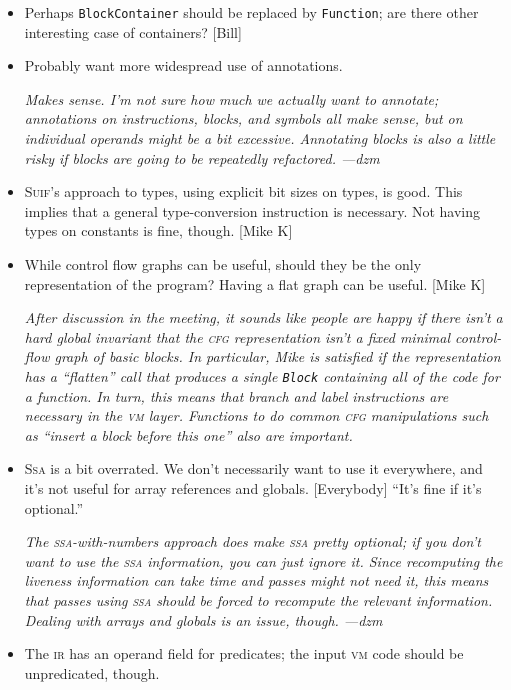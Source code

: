 \documentclass[11pt]{article}
\def\class#1{\texttt{#1}}
\def\cfg{\textsc{cfg}}
\def\ir{\textsc{ir}}
\def\ssa{\textsc{ssa}}
\def\Ssa{\textsc{Ssa}}
\def\Suif{\textsc{Suif}}
\def\vm{\textsc{vm}}
\begin{document}
\begin{itemize}
\item Perhaps \class{BlockContainer} should be replaced by
  \class{Function}; are there other interesting case of containers?
  [Bill]

\item Probably want more widespread use of annotations.

  \emph{Makes sense.  I'm not sure how much we actually want to
    annotate; annotations on instructions, blocks, and symbols all
    make sense, but on individual operands might be a bit excessive.
    Annotating blocks is also a little risky if blocks are going to be
    repeatedly refactored.  ---dzm}

\item \Suif's approach to types, using explicit bit sizes on types, is
  good.  This implies that a general type-conversion instruction is
  necessary.  Not having types on constants is fine, though.  [Mike K]

\item While control flow graphs can be useful, should they be the only
  representation of the program?  Having a flat graph can be useful.
  [Mike K]

  \emph{After discussion in the meeting, it sounds like people are
    happy if there isn't a hard global invariant that the \cfg{}
    representation isn't a fixed minimal control-flow graph of basic
    blocks.  In particular, Mike is satisfied if the representation
    has a ``flatten'' call that produces a single \class{Block}
    containing all of the code for a function.  In turn, this means
    that branch and label instructions are necessary in the \vm{}
    layer.  Functions to do common \cfg{} manipulations such as
    ``insert a block before this one'' also are important.}

\item \Ssa{} is a bit overrated.  We don't necessarily want to use it
  everywhere, and it's not useful for array references and globals.
  [Everybody]  ``It's fine if it's optional.''

  \emph{The \ssa-with-numbers approach does make \ssa{} pretty
    optional; if you don't want to use the \ssa{} information, you can
    just ignore it.  Since recomputing the liveness information can
    take time and passes might not need it, this means that passes
    using \ssa{} should be forced to recompute the relevant
    information.  Dealing with arrays and globals is an issue,
    though.  ---dzm}

\item The \ir{} has an operand field for predicates; the input \vm{}
  code should be unpredicated, though.


\end{itemize}
\end{document}
